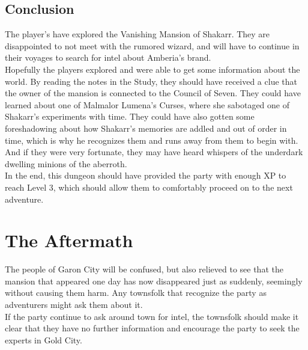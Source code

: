 \subsection{Conclusion}
The player's have explored the Vanishing Mansion of Shakarr. They are disappointed to not meet with the rumored wizard, and will have to continue in their voyages to search for intel about Amberia's brand. \\
Hopefully the players explored and were able to get some information about the world. By reading the notes in the Study, they should have received a clue that the owner of the mansion is connected to the Council of Seven. They could have learned about one of Malmalor Lumena's Curses, where she sabotaged one of Shakarr's experiments with time. They could have also gotten some foreshadowing about how Shakarr's memories are addled and out of order in time, which is why he recognizes them and runs away from them to begin with. And if they were very fortunate, they may have heard whispers of the underdark dwelling minions of the aberroth.\\
In the end, this dungeon should have provided the party with enough XP to reach Level 3, which should allow them to comfortably proceed on to the next adventure.
\section{The Aftermath}
The people of Garon City will be confused, but also relieved to see that the mansion that appeared one day has now disappeared just as suddenly, seemingly without causing them harm. Any townsfolk that recognize the party as adventurers might ask them about it. \\
If the party continue to ask around town for intel, the townsfolk should make it clear that they have no further information and encourage the party to seek the experts in Gold City.
